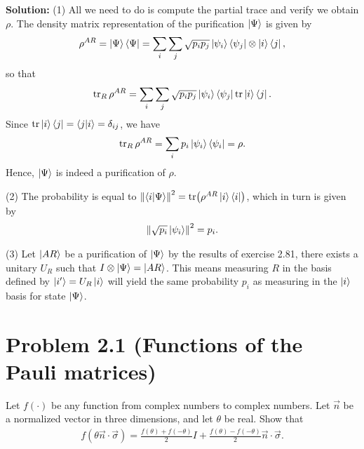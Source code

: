 \documentclass{book}
\begin{document}
    \textbf{Solution:} (1) All we need to do is compute the partial trace and verify we obtain $\rho$. The density matrix representation of the purification $\ket{\Psi}$ is given by
    \begin{align}
        \rho^{AR} = \ket{\Psi}\bra{\Psi} = \sum_i \sum_j \sqrt{p_i p_j} \ket{\psi_i}\bra{\psi_j} \otimes \ket{i}\bra{j},
    \end{align}
    so that 
    \begin{align}
        \tr_R \rho^{AR} = \sum_i \sum_j \sqrt{p_i p_j} \ket{\psi_i}\bra{\psi_j} \tr \ket{i}\bra{j}.
    \end{align}
    Since $\tr \ket{i}\bra{j} = \bra{j}\ket{i} = \delta_{ij}$, we have
    \begin{align}
        \tr_R \rho^{AR} = \sum_i p_i \ket{\psi_i}\bra{\psi_i} = \rho.
    \end{align}
    Hence, $\ket{\Psi}$ is indeed a purification of $\rho$.

    (2) The probability is equal to $\norm{\bra{i} \ket{\Psi}}^2 = \tr (\rho^{AR} \ket{i}\bra{i})$, which in turn is given by
    \begin{align}
        \norm{\sqrt{p_i} \ket{\psi_i}}^2 = p_i.
    \end{align}

    (3) Let $\ket{AR}$ be a purification of $\ket{\Psi}$ by the results of exercise 2.81, there exists a unitary $U_R$ such that $I \otimes \ket{\Psi} = \ket{AR}$. This means measuring $R$ in the basis defined by $\ket{i'} = U_R \ket{i}$ will yield the same probability $p_i$ as measuring in the $\ket{i}$ basis for state $\ket{\Psi}$.

\section*{Problem 2.1 (Functions of the Pauli matrices)}
    Let $f(\cdot)$ be any function from complex numbers to complex numbers. Let $\vec{n}$ be a normalized vector in three dimensions, and let $\theta$ be real. Show that
    \begin{align}
        f(\theta \vec{n} \cdot \vec{\sigma}) = \frac{f(\theta) + f(-\theta)}{2} I + \frac{f(\theta)- f(-\theta)}{2} \vec{n} \cdot \vec{\sigma}.
    \end{align}
\end{document}
